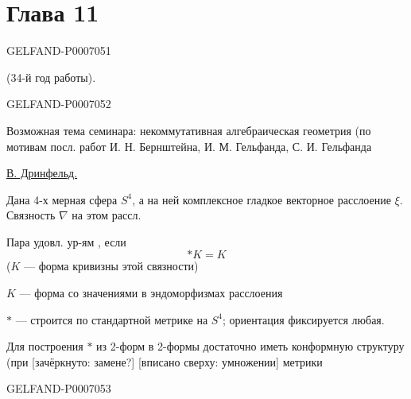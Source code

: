 \clearpage\section*{Глава 11}

\begin{GelfandAdjacentEvidence}{GELFAND-P000705}{1}

\quad {} \quad (34-й год работы).
\end{GelfandAdjacentEvidence}
\begin{GelfandAdjacentEvidence}{GELFAND-P000705}{2}


Возможная тема семинара: некоммутативная алгебраическая геометрия
(по мотивам посл. работ И. Н. Бернштейна, И. М. Гельфанда, С. И. Гельфанда

\underline{В. Дринфельд.}\quad{}

Дана 4-х мерная сфера \(S^4\), а на ней комплексное гладкое векторное расслоение \(\xi\).
Связность \(\nabla\) на этом рассл.

Пара удовл. ур-ям , если
\begin{equation}
*K=K \tag{1}
\end{equation}
(\(K\) --- форма кривизны этой связности)

\(K\) --- форма со значениями в эндоморфизмах расслоения

\(*\) --- строится по стандартной метрике на \(S^4\);
ориентация фиксируется любая.

Для построения \(*\) из 2-форм в 2-формы достаточно иметь конформную структуру (при
[зачёркнуто: замене?] [вписано сверху: умножении] метрики
\end{GelfandAdjacentEvidence}
\begin{GelfandAdjacentEvidence}{GELFAND-P000705}{3}

\end{GelfandAdjacentEvidence}



